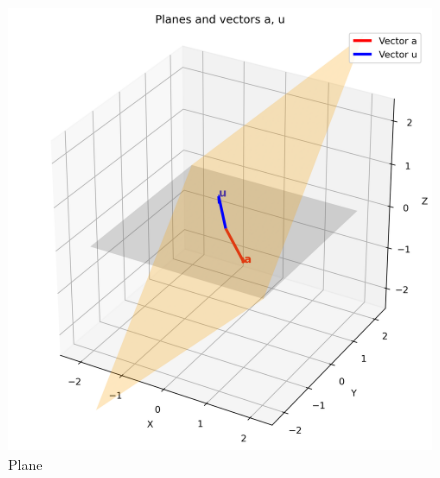 \documentclass[journal]{IEEEtran}
\begin{document}
\begin{figure}[htbp]
    \centering
    \includegraphics[width=\columnwidth]{figs/fig1.png}
    \caption{Plane}
    \label{fig:fig/fig1.png}
\end{figure}
\end{document}
